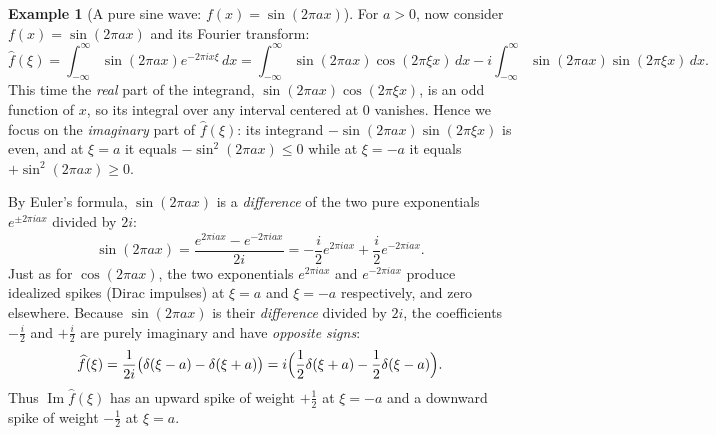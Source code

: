 \documentclass[11pt]{article}
\theoremstyle{plain}
\theoremstyle{definition}
\newtheorem{example}[theorem]{Example}
\theoremstyle{boldremark}
\theoremstyle{remark}
\numberwithin{equation}{section}
\DeclareMathOperator{\Imag}{Im}
\begin{document}
\begin{example}[A pure sine wave: $f(x)=\sin(2\pi ax)$]
For $a>0$, now consider $f(x)=\sin(2\pi ax)$ and its Fourier transform:
\[
 \widehat f(\xi) = \int_{-\infty}^{\infty}\sin(2\pi ax)e^{-2\pi ix\xi}\,dx
  = \int_{-\infty}^{\infty}\sin(2\pi ax)\cos(2\pi\xi x)\,dx
  - i\int_{-\infty}^{\infty}\sin(2\pi ax)\sin(2\pi\xi x)\,dx.
\]
This time the \emph{real} part of the integrand, $\sin(2\pi ax)\cos(2\pi\xi x)$,
is an odd function of $x$, so its integral over any interval centered at
$0$ vanishes. Hence we focus on the \emph{imaginary} part of $\widehat f(\xi)$:
its integrand $-\sin(2\pi ax)\sin(2\pi\xi x)$ is even, and at $\xi=a$ it
equals $-\sin^2(2\pi ax)\le 0$ while at $\xi=-a$ it equals
$+\sin^2(2\pi ax)\ge 0$.

By Euler's formula, $\sin(2\pi ax)$ is a \emph{difference} of the two pure
exponentials $e^{\pm 2\pi iax}$ divided by $2i$:
\[
 \sin(2\pi ax) = \frac{e^{2\pi iax} - e^{-2\pi iax}}{2i}
               = -\frac{i}{2}e^{2\pi iax} + \frac{i}{2}e^{-2\pi iax}.
\]
Just as for $\cos(2\pi ax)$, the two exponentials $e^{2\pi iax}$ and
$e^{-2\pi iax}$ produce idealized spikes (Dirac impulses) at $\xi=a$ and
$\xi=-a$ respectively, and zero elsewhere. Because $\sin(2\pi ax)$ is their
\emph{difference} divided by $2i$, the coefficients $-\frac{i}{2}$ and
$+\frac{i}{2}$ are purely imaginary and have \emph{opposite signs}:
\[
 \widehat f(\xi)
  = \frac{1}{2i}\bigl(\delta(\xi-a)-\delta(\xi+a)\bigr)
  = i\Bigl(\frac{1}{2}\delta(\xi+a)-\frac{1}{2}\delta(\xi-a)\Bigr).
\]
Thus $\Imag\widehat f(\xi)$ has an upward spike of weight $+\frac{1}{2}$
at $\xi=-a$ and a downward spike of weight $-\frac{1}{2}$ at $\xi=a$.


\end{example}
\end{document}
